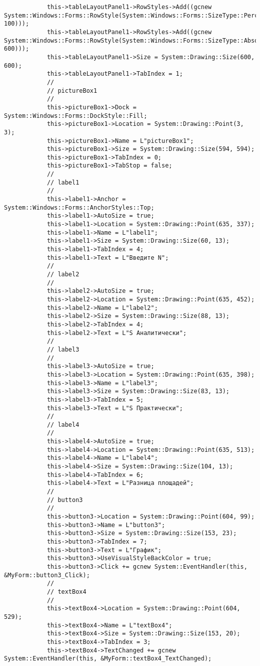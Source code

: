 \documentclass[a4paper,12pt]{article}
\begin{document}
\begin{verbatim}
			this->tableLayoutPanel1->RowStyles->Add((gcnew System::Windows::Forms::RowStyle(System::Windows::Forms::SizeType::Percent, 100)));
			this->tableLayoutPanel1->RowStyles->Add((gcnew System::Windows::Forms::RowStyle(System::Windows::Forms::SizeType::Absolute, 600)));
			this->tableLayoutPanel1->Size = System::Drawing::Size(600, 600);
			this->tableLayoutPanel1->TabIndex = 1;
			// 
			// pictureBox1
			// 
			this->pictureBox1->Dock = System::Windows::Forms::DockStyle::Fill;
			this->pictureBox1->Location = System::Drawing::Point(3, 3);
			this->pictureBox1->Name = L"pictureBox1";
			this->pictureBox1->Size = System::Drawing::Size(594, 594);
			this->pictureBox1->TabIndex = 0;
			this->pictureBox1->TabStop = false;
			// 
			// label1
			// 
			this->label1->Anchor = System::Windows::Forms::AnchorStyles::Top;
			this->label1->AutoSize = true;
			this->label1->Location = System::Drawing::Point(635, 337);
			this->label1->Name = L"label1";
			this->label1->Size = System::Drawing::Size(60, 13);
			this->label1->TabIndex = 4;
			this->label1->Text = L"Введите N";
			// 
			// label2
			// 
			this->label2->AutoSize = true;
			this->label2->Location = System::Drawing::Point(635, 452);
			this->label2->Name = L"label2";
			this->label2->Size = System::Drawing::Size(88, 13);
			this->label2->TabIndex = 4;
			this->label2->Text = L"S Аналитически";
			// 
			// label3
			// 
			this->label3->AutoSize = true;
			this->label3->Location = System::Drawing::Point(635, 398);
			this->label3->Name = L"label3";
			this->label3->Size = System::Drawing::Size(83, 13);
			this->label3->TabIndex = 5;
			this->label3->Text = L"S Практически";
			// 
			// label4
			// 
			this->label4->AutoSize = true;
			this->label4->Location = System::Drawing::Point(635, 513);
			this->label4->Name = L"label4";
			this->label4->Size = System::Drawing::Size(104, 13);
			this->label4->TabIndex = 6;
			this->label4->Text = L"Разница площадей";
			// 
			// button3
			// 
			this->button3->Location = System::Drawing::Point(604, 99);
			this->button3->Name = L"button3";
			this->button3->Size = System::Drawing::Size(153, 23);
			this->button3->TabIndex = 7;
			this->button3->Text = L"График";
			this->button3->UseVisualStyleBackColor = true;
			this->button3->Click += gcnew System::EventHandler(this, &MyForm::button3_Click);
			// 
			// textBox4
			// 
			this->textBox4->Location = System::Drawing::Point(604, 529);
			this->textBox4->Name = L"textBox4";
			this->textBox4->Size = System::Drawing::Size(153, 20);
			this->textBox4->TabIndex = 3;
			this->textBox4->TextChanged += gcnew System::EventHandler(this, &MyForm::textBox4_TextChanged);

\end{verbatim}
\end{document}
